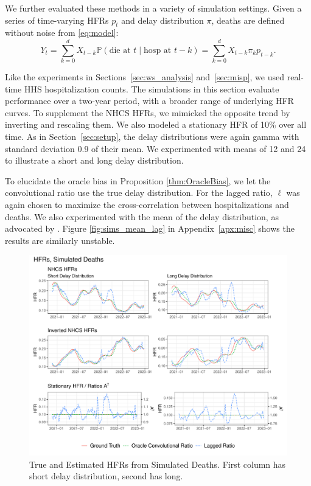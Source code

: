 \documentclass{article}
\newcommand{\given}{\; \vert \;}
\begin{document}
We further evaluated these methods in a variety of simulation settings. Given a series of time-varying HFRs $p_t$ and delay distribution $\pi$, deaths are defined without noise from \eqref{eq:model}:
$$Y_t = \sum_{k=0}^d X_{t-k} \mathbb{P}(\text{die at $t$}\given\text{hosp at }t-k) = \sum_{k=0}^d X_{t-k} \pi_k p_{t-k}.$$

Like the experiments in Sections~\ref{sec:ws_analysis} and~\ref{sec:misp}, we
used real-time HHS hospitalization counts. The simulations in this
section evaluate performance over a two-year period, with a broader range of
underlying HFR curves. To supplement the NHCS HFRs, we mimicked the opposite
trend by inverting and rescaling them. We also modeled a stationary HFR of 10\%
over all time. As in Section~\ref{sec:setup}, the delay distributions were again
gamma with standard deviation 0.9 of their mean. We experimented with means of
12 and 24 to illustrate a short and long delay distribution. 

To elucidate the oracle bias in Proposition \ref{thm:OracleBias}, we let the convolutional ratio use the true delay distribution. For the lagged ratio, $\ell$ was again chosen to maximize the cross-correlation between hospitalizations and deaths. We also experimented with the mean of the delay distribution, as advocated by \citet{lagged_chinese}. Figure \ref{fig:sims_mean_lag} in Appendix~\ref{apx:misc} shows the results are similarly unstable.


\begin{figure}
    \centering
    \includegraphics[width=\linewidth]{Figures/Simulated/simulated_results_corr_lag.pdf}
    \caption{True and Estimated HFRs from Simulated Deaths. First column has short delay distribution, second has long.}
    \label{fig:sims}
\end{figure}
\end{document}
